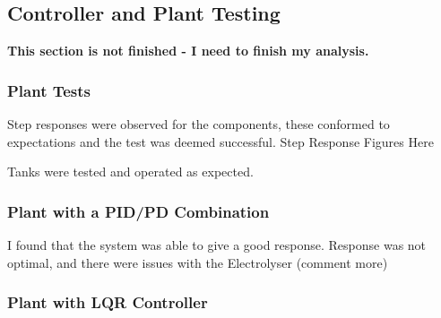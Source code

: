 \subsection{Controller and Plant Testing}
\label{sec:pwrtesting}

{\bf \color{red} This section is not finished - I need to finish my analysis.}
\subsubsection{Plant Tests}

Step responses were observed for the components, these conformed to expectations and the test was deemed successful.
{\color{red}Step Response Figures Here}

Tanks were tested and operated as expected.


\subsubsection{Plant with a PID/PD Combination}

I found that the system was able to give a good response.
Response was not optimal, and there were issues with the Electrolyser {\color{red}(comment more)}

\subsubsection{Plant with LQR Controller}

